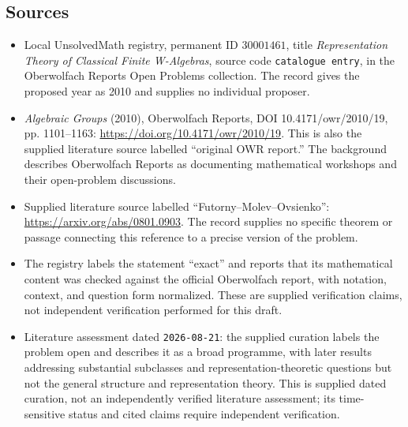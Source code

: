 \documentclass[11pt]{article}
\begin{document}
\subsection{Sources}
\begin{itemize}
\item Local UnsolvedMath registry, permanent ID \(30001461\), title \emph{Representation Theory of Classical Finite W-Algebras}, source code \texttt{catalogue entry}, in the Oberwolfach Reports Open Problems collection. The record gives the proposed year as 2010 and supplies no individual proposer.
\item \emph{Algebraic Groups} (2010), Oberwolfach Reports, DOI 10.4171/owr/2010/19, pp. 1101--1163: \url{https://doi.org/10.4171/owr/2010/19}. This is also the supplied literature source labelled ``original OWR report.'' The background describes Oberwolfach Reports as documenting mathematical workshops and their open-problem discussions.
\item Supplied literature source labelled ``Futorny--Molev--Ovsienko'': \url{https://arxiv.org/abs/0801.0903}. The record supplies no specific theorem or passage connecting this reference to a precise version of the problem.
\item The registry labels the statement ``exact'' and reports that its mathematical content was checked against the official Oberwolfach report, with notation, context, and question form normalized. These are supplied verification claims, not independent verification performed for this draft.
\item Literature assessment dated \texttt{2026-08-21}: the supplied curation labels the problem open and describes it as a broad programme, with later results addressing substantial subclasses and representation-theoretic questions but not the general structure and representation theory. This is supplied dated curation, not an independently verified literature assessment; its time-sensitive status and cited claims require independent verification.
\end{itemize}
\end{document}
